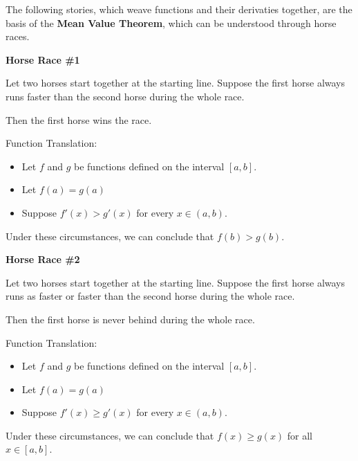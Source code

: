 \documentclass{ximera}
\begin{document}
The following stories, which weave functions and their derivaties together, are the basis of the \textbf{Mean Value Theorem}, which can be understood through horse races. 










\begin{idea} \textbf{\textcolor{blue!55!black}{Horse Race \#1}}   


Let two horses start together at the starting line. Suppose the first horse always runs faster than the second horse during the whole race.

Then the first horse wins the race.



Function Translation:

\begin{itemize}
\item Let $f$ and $g$ be functions defined on the interval $[a, b]$. 
\item Let $f(a) = g(a)$
\item Suppose $f'(x) > g'(x)$ for every $x \in (a,b)$. 
\end{itemize}

Under these circumstances, we can conclude that $f(b) > g(b)$.






\end{idea}












\begin{idea} \textbf{\textcolor{blue!55!black}{Horse Race \#2}}   


Let two horses start together at the starting line. Suppose the first horse always runs as faster or faster than the second horse during the whole race.

Then the first horse is never behind during the whole race.



Function Translation:

\begin{itemize}
\item Let $f$ and $g$ be functions defined on the interval $[a, b]$. 
\item Let $f(a) = g(a)$
\item Suppose $f'(x) \geq g'(x)$ for every $x \in (a,b)$. 
\end{itemize}

Under these circumstances, we can conclude that $f(x) \geq g(x)$ for all $x \in [a,b]$.



\end{idea}
\end{document}
